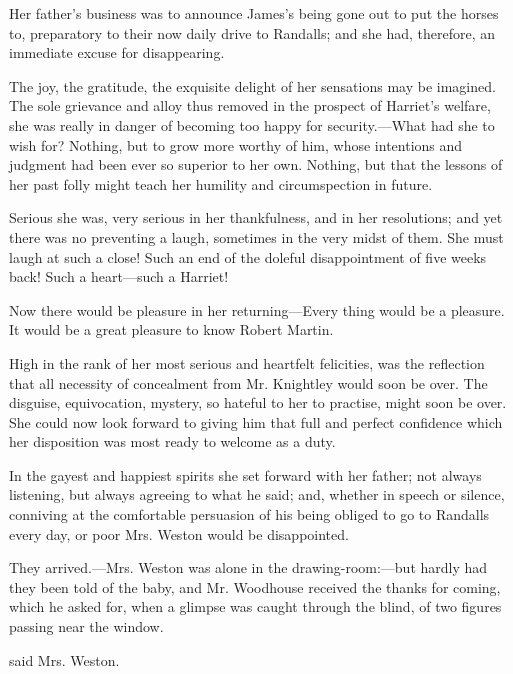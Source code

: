 Her father's business was to announce James's being gone out to put the horses to, preparatory to their now daily drive to Randalls; and she had, therefore, an immediate excuse for disappearing.

The joy, the gratitude, the exquisite delight of her sensations may be imagined. The sole grievance and alloy thus removed in the prospect of Harriet's welfare, she was really in danger of becoming too happy for security.---What had she to wish for? Nothing, but to grow more worthy of him, whose intentions and judgment had been ever so superior to her own. Nothing, but that the lessons of her past folly might teach her humility and circumspection in future.

Serious she was, very serious in her thankfulness, and in her resolutions; and yet there was no preventing a laugh, sometimes in the very midst of them. She must laugh at such a close! Such an end of the doleful disappointment of five weeks back! Such a heart---such a Harriet!

Now there would be pleasure in her returning---Every thing would be a pleasure. It would be a great pleasure to know Robert Martin.

High in the rank of her most serious and heartfelt felicities, was the reflection that all necessity of concealment from Mr. Knightley would soon be over. The disguise, equivocation, mystery, so hateful to her to practise, might soon be over. She could now look forward to giving him that full and perfect confidence which her disposition was most ready to welcome as a duty.

In the gayest and happiest spirits she set forward with her father; not always listening, but always agreeing to what he said; and, whether in speech or silence, conniving at the comfortable persuasion of his being obliged to go to Randalls every day, or poor Mrs. Weston would be disappointed.

They arrived.---Mrs. Weston was alone in the drawing-room:---but hardly had they been told of the baby, and Mr. Woodhouse received the thanks for coming, which he asked for, when a glimpse was caught through the blind, of two figures passing near the window.

 said Mrs. Weston. 

